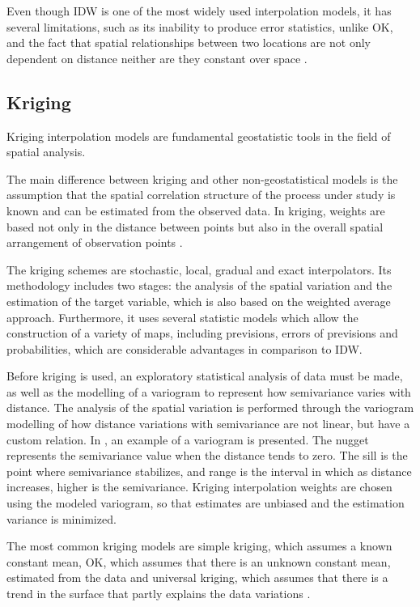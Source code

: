 Even though IDW is one of the most widely used interpolation models, it has several limitations, such as its inability to produce error statistics, unlike OK, and the fact that spatial relationships between two locations are not only dependent on distance neither are they constant over space \cite{Mesquita2009}.

\subsection{Kriging}

Kriging interpolation models are fundamental geostatistic tools in the field of spatial analysis.

The main difference between kriging and other non-geostatistical models is the assumption that the spatial correlation structure of the process under study is known and can be estimated from the observed data. In kriging, weights are based not only in the distance between points but also in the overall spatial arrangement of observation points \cite{Mesquita2009}.

The kriging schemes are stochastic, local, gradual and exact interpolators. Its methodology includes two stages: the analysis of the spatial variation and the estimation of the target variable, which is also based on the weighted average approach. Furthermore, it uses several statistic models which allow the construction of a variety of maps, including previsions, errors of previsions and probabilities, which are considerable advantages in comparison to IDW.

Before kriging is used, an exploratory statistical analysis of data must be made, as well as the modelling of a variogram to represent how semivariance varies with distance. The analysis of the spatial variation is performed through the variogram modelling of how distance variations with semivariance are not linear, but have a custom relation. In , an example of a variogram is presented. The nugget represents the semivariance value when the distance tends to zero. The sill is the point where semivariance stabilizes, and range is the interval in which as distance increases, higher is the semivariance. Kriging interpolation weights are chosen using the modeled variogram, so that estimates are unbiased and the estimation variance is minimized.

The most common kriging models are simple kriging, which assumes a known constant mean, OK, which assumes that there is an unknown constant mean, estimated from the data and universal kriging, which assumes that there is a trend in the surface that partly explains the data variations \cite{Deligiorgi2011}.


